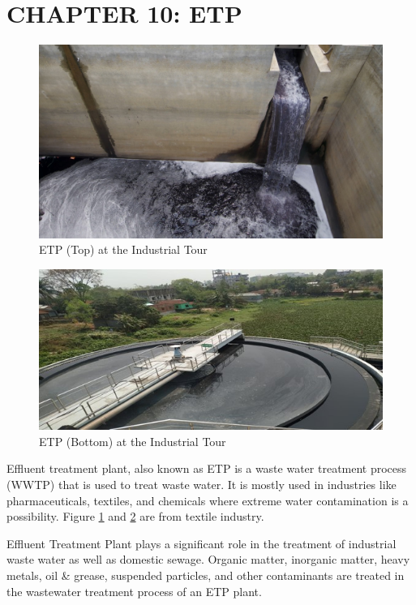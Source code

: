 \section{CHAPTER 10: ETP}
\begin{figure}[h!]
    \centering
    \includegraphics[width=1\linewidth]{figs/etp.jpg}
    \caption{ETP (Top) at the Industrial Tour}
    \label{fig:etp}
\end{figure}

\begin{figure}[h!]
    \centering
    \includegraphics[width=1\linewidth]{figs/etp2.jpg}
    \caption{ETP (Bottom) at the Industrial Tour}
    \label{fig:etp2}
\end{figure}

Effluent treatment plant, also known as ETP is a waste water treatment process (WWTP) that is used to treat waste water. It is mostly used in industries like pharmaceuticals, textiles, and chemicals where extreme water contamination is a possibility. Figure \ref{fig:etp} and \ref{fig:etp2} are from textile industry.

Effluent Treatment Plant plays a significant role in the treatment of industrial waste water as well as domestic sewage. Organic matter, inorganic matter, heavy metals, oil \& grease, suspended particles, and other contaminants are treated in the wastewater treatment process of an ETP plant. 

